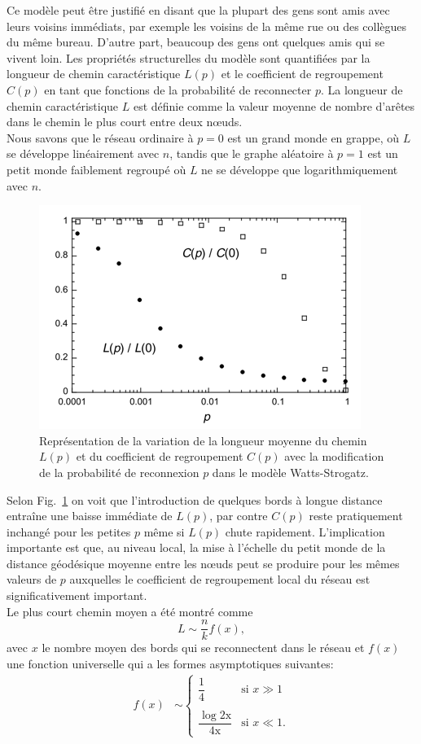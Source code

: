Ce modèle peut être justifié en disant que la plupart des gens sont amis avec leurs voisins immédiats,  par exemple les voisins de la même rue ou des collègues du même bureau. D'autre part, beaucoup des gens ont quelques amis qui se vivent loin. Les propriétés structurelles du modèle sont quantifiées par la longueur de chemin caractéristique $L(p)$ et le coefficient de regroupement $C(p)$ en tant que fonctions de la probabilité de reconnecter $p$. La longueur de chemin caractéristique $L$ est définie comme la valeur moyenne de nombre d'arêtes dans le chemin le plus court entre deux nœuds.\\
Nous savons que le réseau ordinaire à $p=0$ est un grand monde en grappe, où $L$ se développe linéairement avec $n$, tandis que le graphe aléatoire à $p=1$ est un petit monde faiblement regroupé où $L$ ne se développe que logarithmiquement avec $n$. 
\begin{figure}[h!]
	\centering
	\includegraphics[scale=0.75]{./figures/SW2}
	\caption{Représentation de la variation de la longueur moyenne du chemin $L(p)$ et du coefficient de regroupement $C(p)$ avec la modification de la probabilité de reconnexion $p$ dans le modèle Watts-Strogatz.}  	
	\label{SW2}
\end{figure}


Selon Fig.~\ref{SW2} on voit que l'introduction de quelques bords à longue distance entraîne une baisse immédiate de $L(p)$, par contre $C(p)$ reste pratiquement inchangé pour les petites $p$ même si $L(p)$ chute rapidement. L'implication importante est que, au niveau local, la mise à l'échelle du petit monde de la distance géodésique moyenne entre les nœuds peut se produire pour les mêmes valeurs de $p$ auxquelles le coefficient de regroupement local du réseau est significativement important.\\
Le plus court chemin moyen a été montré comme \cite{Barthelemy-Amaral1999,Newman-al2000}
\begin{equation}
  L\sim \frac{n}{k}f(x),
\end{equation}
avec $x$ le nombre moyen des bords qui se reconnectent dans le réseau et $f(x)$  une fonction universelle qui a les formes asymptotiques suivantes:
\begin{align}
f(x)&\sim
\begin{cases}
\dfrac{1}{4} & \text{si } x \gg1\\
\\
\dfrac{\log\mathrm{2x}}{\mathrm{4x}}& \text{si } x \ll1.
\end{cases}
\end{align}

